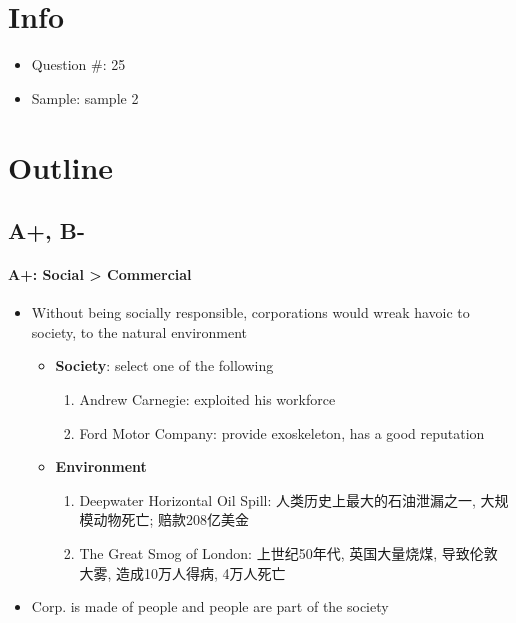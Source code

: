 \documentclass{article}
\begin{document}
  \section{Info}
    \begin{itemize}
      \item Question \#: 25
      \item Sample: sample 2
    \end{itemize}

  \section{Outline}

    \subsection{A+, B-}

      \paragraph{A+: Social > Commercial}
      \begin{itemize}
        \item Without being socially responsible, corporations would wreak
        havoic to society, to the natural environment
        \begin{itemize}
          \item \textbf{Society}: select one of the following
          \begin{enumerate}
            \item Andrew Carnegie: exploited his workforce
            \item Ford Motor Company: provide exoskeleton, has a good
            reputation
          \end{enumerate}

          \item \textbf{Environment}
          \begin{enumerate}
            \item Deepwater Horizontal Oil Spill: 人类历史上最大的石油泄漏之一,
            大规模动物死亡; 赔款208亿美金
            \item The Great Smog of London: 上世纪50年代, 英国大量烧煤, 导致伦敦
            大雾, 造成10万人得病, 4万人死亡
          \end{enumerate}
        \end{itemize}

        \item Corp. is made of people and people are part of the society
      \end{itemize}
\end{document}
